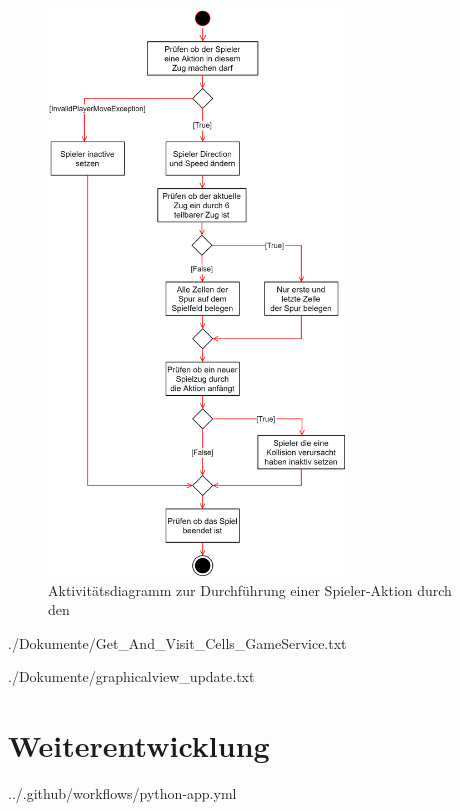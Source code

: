 \begin{figure}[htb]
	\centering
	\includegraphics[width=0.7\textwidth]{Bilder/game_service_do_action_activity_diagram.png}
	\caption{Aktivitätsdiagramm zur Durchführung einer Spieler-Aktion durch den }
	\label{fig:aktivitaetsdiagramm-spieleraktion-gameservice}
\end{figure}
\clearpage

\begin{minipage}{\textwidth}
	
	{./Dokumente/Get_And_Visit_Cells_GameService.txt}
\end{minipage}
\clearpage

\begin{minipage}{\textwidth}
	
	{./Dokumente/graphicalview_update.txt}
\end{minipage}
\clearpage

\section{Weiterentwicklung}
\label{sec:anhang-weiterentwicklung}

\begin{minipage}{\textwidth}
	
	{../.github/workflows/python-app.yml}
\end{minipage}
\clearpage
